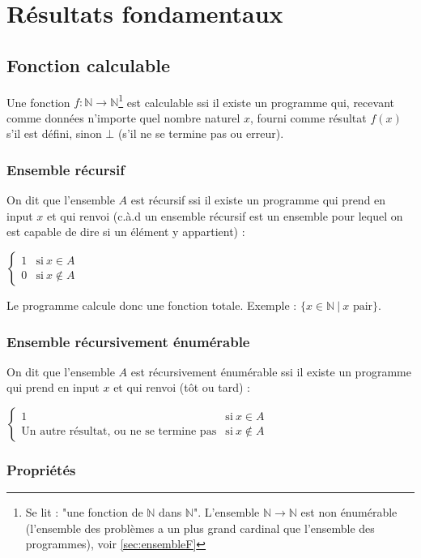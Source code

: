 \chapter{Résultats fondamentaux}

\section{Fonction calculable}

Une fonction $f : \mathbb{N} \rightarrow \mathbb{N}$\footnote{Se lit : "une fonction de $\mathbb{N}$ dans $\mathbb{N}$". L'ensemble $\mathbb{N} \rightarrow \mathbb{N}$ est non énumérable (l'ensemble des problèmes a un plus grand cardinal que l'ensemble des programmes), voir \ref{sec:ensembleF}} est calculable ssi il existe un programme qui, recevant comme données n'importe quel nombre naturel $x$, fourni comme résultat $f(x)$ s'il est défini, sinon $\bot$ (s'il ne se termine pas ou erreur).

\subsection{Ensemble récursif}

On dit que l'ensemble $A$ est récursif ssi il existe un programme qui prend en input $x$ et qui renvoi (c.à.d un ensemble récursif est un ensemble pour lequel on est capable de dire si un élément y appartient) :

$\begin{cases}
	1 & \text{si}\ x \in A\\
	0 & \text{si}\ x \notin A
\end{cases}$

Le programme calcule donc une fonction totale. Exemple : $\{x \in \mathbb{N} \ | \ x \text{ pair}\}$.

\subsection{Ensemble récursivement énumérable}

On dit que l'ensemble $A$ est récursivement énumérable ssi il existe un programme qui prend en input $x$ et qui renvoi (tôt ou tard) :

$\begin{cases}
	1 & \text{si}\ x \in A\\
	\text{Un autre résultat, ou ne se termine pas}& \text{si}\ x \notin A
\end{cases}$

\subsection{Propriétés}

